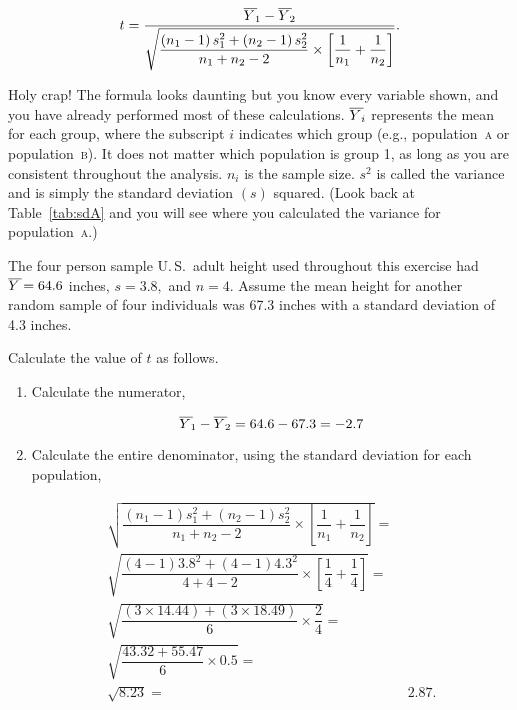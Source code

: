 \documentclass[12pt]{exam}
\newcommand*\meanY{\overline{Y\kern1.67pt}\kern-1.67pt}
\newcommand*\popa{population~\textsc{a}} %
\newcommand*\popb{population~\textsc{b}} %
\begin{document}
\begin{questions}
\begin{equation*}
t = \dfrac{\meanY_1 - \meanY_2}{\sqrt{\dfrac{\left(n_1 - 1\right)s_1^2 + \left(n_2 - 1\right)s_2^2}{n_1 + n_2 -2} \times \left[\dfrac{1}{n_1} + \dfrac{1}{n_2}\right]}}.
\end{equation*}

Holy crap! The formula looks daunting but you know every variable shown, and you have already performed most of these calculations. $\meanY_{i}$ represents the mean for each group, where the subscript $i$ indicates which group (e.g., \popa{} or \popb{}). It does not matter which population is group 1, as long as you are consistent throughout the analysis. $n_i$ is the sample size. $s^2$ is called the variance and is simply the standard deviation $\left(s\right)$ squared. (Look back at Table~\ref{tab:sdA} and you will see where you calculated the variance for \popa{}.) 

The four person sample U.\,S.\ adult height used throughout this exercise had $\meanY = 64.6$ inches, $s = 3.8,$ and $n = 4.$ Assume the mean height for another random sample of four individuals was 67.3 inches with a standard deviation of 4.3 inches.

Calculate the value of $t$ as follows.

\begin{enumerate}

\item Calculate the numerator,

\begin{equation*}
\meanY_1 - \meanY_2 = 64.6 - 67.3 = -2.7
\end{equation*}

\item Calculate the entire denominator, using the standard deviation for each population,

\begin{equation*}
	\begin{split}
		\sqrt{\dfrac{\left(n_1 - 1\right)s_1^2 + \left(n_2 - 1\right)s_2^2}{n_1 + n_2 -2} \times \left[\dfrac{1}{n_1} + \dfrac{1}{n_2}\right]} = & \\
%
		\sqrt{\dfrac{\left(4 - 1\right)3.8^2 + \left(4 - 1\right)4.3^2}{4 + 4 - 2} \times \left[\dfrac{1}{4} + \dfrac{1}{4}\right]} = & \\
%
		\sqrt{\dfrac{\left(3 \times 14.44\right) + \left(3 \times18.49 \right)}{6} \times \dfrac{2}{4}} = & \\
%
		\sqrt{\dfrac{43.32 + 55.47}{6} \times 0.5} = & \\
		\sqrt{8.23} = &\ 2.87.
	\end{split}
\end{equation*}


\end{enumerate}
\end{questions}
\end{document}
